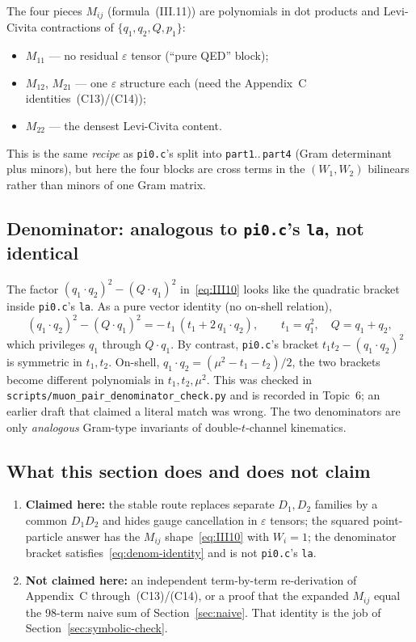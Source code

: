 \documentclass[11pt]{article}
\begin{document}
The four pieces $M_{ij}$ (formula~(III.11)) are polynomials in dot
products and Levi-Civita contractions of $\{q_1,q_2,Q,p_1\}$:
\begin{itemize}
  \item $M_{11}$ --- no residual $\varepsilon$ tensor (``pure QED'' block);
  \item $M_{12}$, $M_{21}$ --- one $\varepsilon$ structure each (need the
    Appendix~C identities~(C13)/(C14));
  \item $M_{22}$ --- the densest Levi-Civita content.
\end{itemize}
This is the same \emph{recipe} as \texttt{pi0.c}'s split into
\texttt{part1}..\,\texttt{part4} (Gram determinant plus minors), but here
the four blocks are cross terms in the $(W_1,W_2)$ bilinears rather than
minors of one Gram matrix.

\subsection{Denominator: analogous to \texttt{pi0.c}'s \texttt{la}, not identical}
\label{sec:stable-denom}

The factor $(q_1{\cdot}q_2)^2-(Q{\cdot}q_1)^2$ in~\eqref{eq:III10} looks
like the quadratic bracket inside \texttt{pi0.c}'s \texttt{la}. As a pure
vector identity (no on-shell relation),
\begin{equation}
  (q_1{\cdot}q_2)^2 - (Q{\cdot}q_1)^2
  = -\,t_1\,(t_1 + 2\,q_1{\cdot}q_2),
  \qquad t_1=q_1^2,\quad Q=q_1+q_2,
  \label{eq:denom-identity}
\end{equation}
which privileges $q_1$ through $Q{\cdot}q_1$. By contrast,
\texttt{pi0.c}'s bracket $t_1 t_2-(q_1{\cdot}q_2)^2$ is symmetric in
$t_1,t_2$. On-shell,
$q_1{\cdot}q_2=(\mu^2-t_1-t_2)/2$, the two brackets become different
polynomials in $t_1,t_2,\mu^2$. This was checked in
\texttt{scripts/muon\_pair\_denominator\_check.py} and is recorded in
Topic~6; an earlier draft that claimed a literal match was wrong.
The two denominators are only \emph{analogous} Gram-type invariants of
double-$t$-channel kinematics.

\subsection{What this section does and does not claim}
\label{sec:stable-claims}

\begin{enumerate}
  \item \textbf{Claimed here:} the stable route replaces separate
    $D_1,D_2$ families by a common $D_1 D_2$ and hides gauge cancellation
    in $\varepsilon$ tensors; the squared point-particle answer has the
    $M_{ij}$ shape~\eqref{eq:III10} with $W_i=1$; the denominator bracket
    satisfies~\eqref{eq:denom-identity} and is not \texttt{pi0.c}'s
    \texttt{la}.
  \item \textbf{Not claimed here:} an independent term-by-term
    re-derivation of Appendix~C through~(C13)/(C14), or a proof that the
    expanded $M_{ij}$ equal the 98-term naive sum of
    Section~\ref{sec:naive}. That identity is the job of
    Section~\ref{sec:symbolic-check}.
\end{enumerate}
\end{document}
